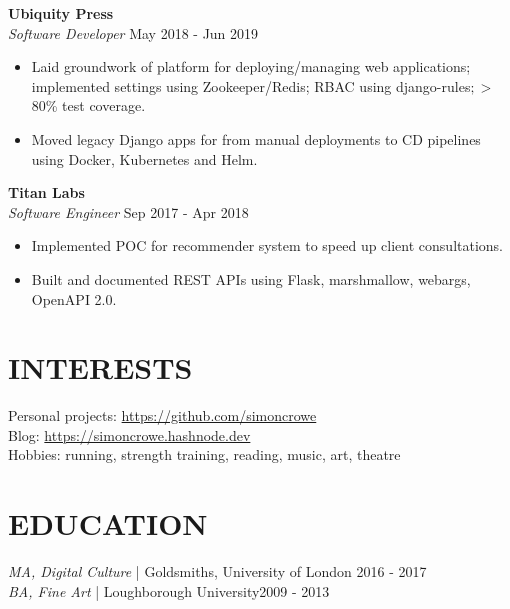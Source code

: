 \documentclass[line,margin]{res}
\begin{document}
\begin{resume}
                \textbf{Ubiquity Press} \\
                {\sl Software Developer} \hfill        May 2018 - Jun 2019 \\
                  \begin{itemize} \itemsep -0pt %
                  \item Laid groundwork of platform for deploying/managing web applications;
                        implemented settings using Zookeeper/Redis; RBAC using django-rules$; > $80\% test coverage.
                  \item Moved legacy Django apps for from manual deployments to CD pipelines \\
                        using Docker, Kubernetes and Helm.
                  \end{itemize}

	        \textbf{Titan Labs} \\
                {\sl Software Engineer} \hfill         Sep 2017 - Apr 2018 \\
                  \begin{itemize} \itemsep -0pt %
                  \item Implemented POC for recommender system to speed up client consultations.
                  \item Built and documented REST APIs using Flask, marshmallow, webargs, OpenAPI 2.0.
                  \end{itemize}



\section{INTERESTS} Personal projects: \url{https://github.com/simoncrowe} \\
                    Blog: \url{https://simoncrowe.hashnode.dev} \\
                    Hobbies: running, strength training, reading, music, art, theatre

\section{EDUCATION} {\sl MA, Digital Culture} | Goldsmiths, University of London \hfill 2016 - 2017 \\
                    {\sl BA, Fine Art} | Loughborough University\hfill 2009 - 2013

\end{resume}
\end{document}
